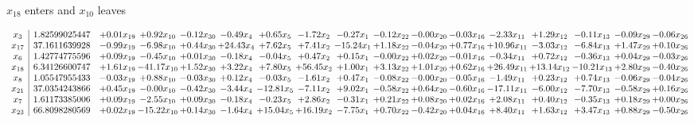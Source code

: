 \documentclass[9pt]{article}
\begin{document}
 $ x_{18} $ enters and $ x_{10} $ leaves 

 \[\begin{array}{c| c c@{\hskip 2pt} c@{\hskip 2pt} c@{\hskip 2pt} c@{\hskip 2pt} c@{\hskip 2pt} c@{\hskip 2pt} c@{\hskip 2pt} c@{\hskip 2pt} c@{\hskip 2pt} c@{\hskip 2pt} c@{\hskip 2pt} c@{\hskip 2pt} c@{\hskip 2pt} c@{\hskip 2pt} c@{\hskip 2pt} }
 x_{3}   &  1.82599025447 & +  0.01 x_{19} & +  0.92 x_{10} & -0.12 x_{30} & -0.49 x_{4} & +  0.65 x_{5} & -1.72 x_{2} & -0.27 x_{1} & -0.12 x_{22} & -0.00 x_{20} & -0.03 x_{16} & -2.33 x_{11} & +  1.29 x_{12} & -0.11 x_{13} & -0.09 x_{29} & -0.06 x_{26}\\
 x_{17}   &  37.1611639928 & -0.99 x_{19} & -6.98 x_{10} & +  0.44 x_{30} & + 24.43 x_{4} & +  7.62 x_{5} & +  7.41 x_{2} & -15.24 x_{1} & +  1.18 x_{22} & -0.04 x_{20} & +  0.77 x_{16} & + 10.96 x_{11} & -3.03 x_{12} & -6.84 x_{13} & +  1.47 x_{29} & +  0.10 x_{26}\\
 x_{6}   &  1.42774775596 & +  0.09 x_{19} & -0.45 x_{10} & +  0.01 x_{30} & -0.18 x_{4} & -0.04 x_{5} & +  0.47 x_{2} & +  0.15 x_{1} & -0.00 x_{22} & +  0.02 x_{20} & -0.01 x_{16} & -0.34 x_{11} & +  0.72 x_{12} & -0.36 x_{13} & +  0.04 x_{29} & -0.03 x_{26}\\
 x_{18}   &  6.34126600747 & +  1.61 x_{19} & -41.17 x_{10} & +  1.52 x_{30} & +  3.22 x_{4} & +  7.80 x_{5} & + 56.45 x_{2} & +  1.00 x_{1} & +  3.13 x_{22} & +  1.01 x_{20} & +  0.62 x_{16} & + 26.49 x_{11} & + 13.14 x_{12} & -10.21 x_{13} & +  2.80 x_{29} & -0.40 x_{26}\\
 x_{8}   &  1.05547955433 & -0.03 x_{19} & +  0.88 x_{10} & -0.03 x_{30} & +  0.12 x_{4} & -0.03 x_{5} & -1.61 x_{2} & +  0.47 x_{1} & -0.08 x_{22} & -0.00 x_{20} & -0.05 x_{16} & -1.49 x_{11} & +  0.23 x_{12} & +  0.74 x_{13} & -0.06 x_{29} & -0.04 x_{26}\\
 x_{21}   &  37.0354243866 & +  0.45 x_{19} & -0.00 x_{10} & -0.42 x_{30} & -3.44 x_{4} & -12.81 x_{5} & -7.11 x_{2} & +  9.02 x_{1} & -0.58 x_{22} & +  0.64 x_{20} & -0.60 x_{16} & -17.11 x_{11} & -6.00 x_{12} & -7.70 x_{13} & -0.58 x_{29} & +  0.16 x_{26}\\
 x_{7}   &  1.61173385006 & +  0.09 x_{19} & -2.55 x_{10} & +  0.09 x_{30} & -0.18 x_{4} & -0.23 x_{5} & +  2.86 x_{2} & -0.31 x_{1} & +  0.21 x_{22} & +  0.08 x_{20} & +  0.02 x_{16} & +  2.08 x_{11} & +  0.40 x_{12} & -0.35 x_{13} & +  0.18 x_{29} & +  0.00 x_{26}\\
 x_{23}   &  66.8098280569 & +  0.02 x_{19} & -15.22 x_{10} & +  0.14 x_{30} & -1.64 x_{4} & + 15.04 x_{5} & + 16.19 x_{2} & -7.75 x_{1} & +  0.70 x_{22} & -0.42 x_{20} & +  0.04 x_{16} & +  8.40 x_{11} & +  1.63 x_{12} & +  3.47 x_{13} & +  0.88 x_{29} & -0.50 x_{26}\\

\end{array}\]
\end{document}

